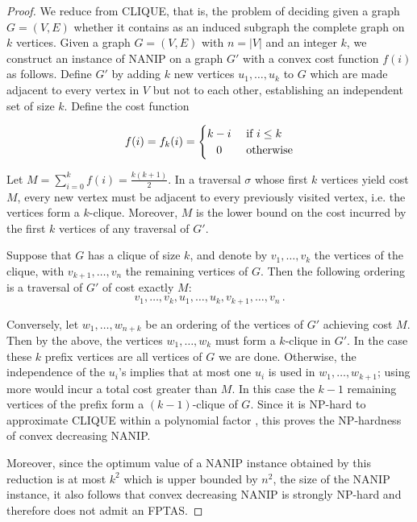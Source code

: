 \documentclass[english]{llncs}
\begin{document}
\begin{proof} 

We reduce from CLIQUE, that is, the problem of deciding given a graph $G =
(V,E)$ whether it contains as an induced subgraph the complete graph on $k$
vertices.  Given a graph $G = (V,E)$ with $n=|V|$ and an integer $k$, we
construct an instance of NANIP on a graph $G'$ with a convex cost function
$f(i)$ as follows.  Define $G'$ by adding $k$ new vertices $u_1, \dots, u_k$ to
$G$ which are made adjacent to every vertex in $V$ but not to each other, establishing
an independent set of size $k$.
Define the cost function 

\[
 f(i) = f_k(i) =
  \begin{cases} 
      \hfill k-i    \hfill & \text{ if $i \leq k$} \\
      \hfill 0          \hfill & \text{ otherwise} \\
  \end{cases}
\]


Let $M = \sum_{i=0}^{k} f(i)=\frac{k(k+1)}2$.  In a traversal $\sigma$ whose
first $k$ vertices yield cost $M$, every new vertex must be adjacent to every
previously visited vertex, i.e. the vertices form a $k$-clique.  Moreover, $M$
is the lower bound on the cost incurred by the first $k$ vertices of any
traversal of $G'$. 

Suppose that $G$ has a clique of size $k$, and denote by $v_1, \dots, v_k$ the
vertices of the clique, with $v_{k+1}, \dots, v_n$ the remaining vertices of
$G$. Then the following ordering is a traversal of $G'$ of cost exactly $M$:
\[
   v_1, \dots, v_k, u_1, \dots, u_k, v_{k+1}, \dots, v_n \,.
\]

Conversely, let $w_1, \dots, w_{n+k}$ be an ordering of the vertices of $G'$
achieving cost $M$.  Then by the above, the vertices $w_1, \dots, w_{k}$ must
form a $k$-clique in $G'$.  In the case these $k$ prefix vertices are all
vertices of $G$ we are done.  Otherwise, the independence of the $u_i$'s
implies that at most one $u_i$ is used in $w_1, \dots, w_{k+1}$; using more
would incur a total cost greater than $M$.  In this case the $k-1$ remaining
vertices of the prefix form a $(k-1)$-clique of $G$.
Since it is NP-hard to approximate CLIQUE within a polynomial factor
\cite{Zuckerman06}, this proves the NP-hardness of convex decreasing NANIP.

Moreover, since the optimum value of a NANIP instance obtained by this reduction
is at most $k^2$ which is upper bounded by $n^2$, the size of the NANIP instance,
it also follows that convex decreasing NANIP is strongly NP-hard and therefore
does not admit an FPTAS. 

\end{proof}
\end{document}
